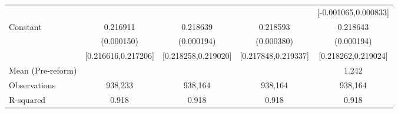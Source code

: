 {\begin{tabular}{l*{4}{c}}
                    &                     &                     &                     &[-0.001065,0.000833]         \\
Constant            &    0.216911\sym{***}&    0.218639\sym{***}&    0.218593\sym{***}&    0.218643\sym{***}\\
                    &  (0.000150)         &  (0.000194)         &  (0.000380)         &  (0.000194)         \\
                    &[0.216616,0.217206]         &[0.218258,0.219020]         &[0.217848,0.219337]         &[0.218262,0.219024]         \\
\midrule
Mean (Pre-reform)   &                     &                     &                     &       1.242         \\
Observations        &     938,233         &     938,164         &     938,164         &     938,164         \\
R-squared           &       0.918         &       0.918         &       0.918         &       0.918         \\
\bottomrule
\end{tabular}
}
